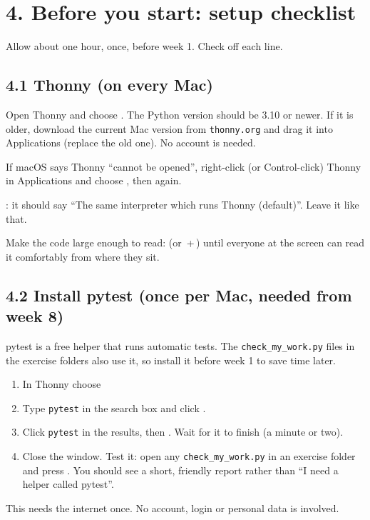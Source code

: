 \documentclass[level=2,teacher]{kidscode}
\begin{document}
\section{4. Before you start: setup checklist}
Allow about one hour, once, before week 1. Check off each line.

\subsection{4.1 Thonny (on every Mac)}
\begin{checklist}
  \item Open Thonny and choose . The Python version should be
        3.10 or newer. If it is older, download the current Mac version from
        \texttt{thonny.org} and drag it into Applications (replace the old one). No account is needed.
  \item If macOS says Thonny \enquote{cannot be opened}, right-click (or Control-click) Thonny
        in Applications and choose , then  again.
  \item {}: it should say \enquote{The same interpreter which runs
        Thonny (default)}. Leave it like that.
  \item Make the code large enough to read:  (or \,+\,\keys{+}) until
        everyone at the screen can read it comfortably from where they sit.
\end{checklist}

\subsection{4.2 Install pytest (once per Mac, needed from week 8)}
pytest is a free helper that runs automatic tests. The \texttt{check\_my\_work.py} files in the
exercise folders also use it, so install it before week 1 to save time later.
\begin{enumerate}[itemsep=1pt]
  \item In Thonny choose 
  \item Type \texttt{pytest} in the search box and click .
  \item Click \texttt{pytest} in the results, then . Wait for it to finish (a minute or two).
  \item Close the window. Test it: open any \texttt{check\_my\_work.py} in an exercise folder and press
        . You should see a short, friendly report rather than \enquote{I need a helper called pytest}.
\end{enumerate}
This needs the internet once. No account, login or personal data is involved.
\end{document}
